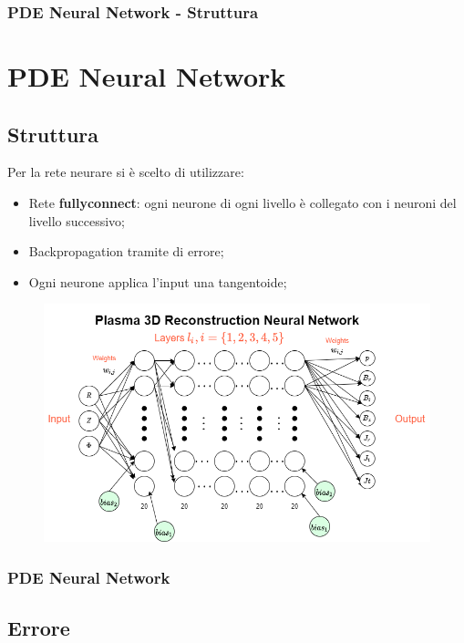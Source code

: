 \documentclass{beamer}
\begin{document}
\begin{frame}
	\frametitle{PDE Neural Network - Struttura} %
	\section{PDE Neural Network}
	\subsection{Struttura}
	Per la rete neurare si è scelto di utilizzare:
	\begin{itemize}
		\item Rete \textbf{fullyconnect}: ogni neurone di ogni livello è collegato con i neuroni del livello successivo;
		\item Backpropagation tramite di errore;
		\item Ogni neurone applica l'input una tangentoide;
	\end{itemize}
	\begin{figure}
		\includegraphics[scale=0.3]{reteOrganizzazione.png}
	\end{figure}

\end{frame}
\begin{frame}
	\frametitle{PDE Neural Network}
	\subsection{Errore}
	\vspace{-0.1cm}
		\begin{figure}
		\end{figure}
\end{frame}
\end{document}
